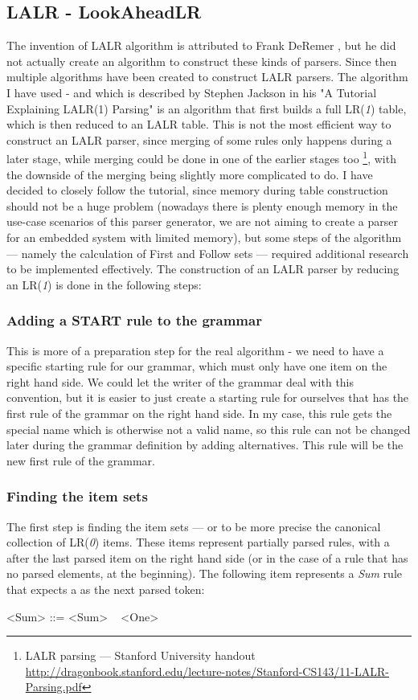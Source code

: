 \subsection{LALR - LookAheadLR}
The invention of LALR algorithm is attributed to Frank DeRemer \cite{deremer1969practical}, but he did not actually create an algorithm to construct these kinds of parsers. Since then multiple algorithms have been created to construct LALR parsers. The algorithm I have used - and which is described by Stephen Jackson in his "A Tutorial Explaining LALR(1) Parsing" \cite{lalr1} is an algorithm that first builds a full LR(\textit{1}) table, which is then reduced to an LALR table. This is not the most efficient way to construct an LALR parser, since merging of some rules only happens during a later stage, while merging could be done in one of the earlier stages too \footnote{LALR parsing --- Stanford University handout \url{http://dragonbook.stanford.edu/lecture-notes/Stanford-CS143/11-LALR-Parsing.pdf}}, with the downside of the merging being slightly more complicated to do. I have decided to closely follow the tutorial, since memory during table construction should not be a huge problem (nowadays there is plenty enough memory in the use-case scenarios of this parser generator, we are not aiming to create a parser for an embedded system with limited memory), but some steps of the algorithm ---  namely the calculation of First and Follow sets --- required additional research to be implemented effectively.
The construction of an LALR parser by reducing an LR(\textit{1}) is done in the following steps:
\subsubsection{Adding a START rule to the grammar}
This is more of a preparation step for the real algorithm - we need to have a specific starting rule for our grammar, which must only have one item on the right hand side. We could let the writer of the grammar deal with this convention, but it is easier to just create a starting rule for ourselves that has the first rule of the grammar on the right hand side. In my case, this rule gets the special name  which is otherwise not a valid name, so this rule can not be changed later during the grammar definition by adding alternatives. This rule will be the new first rule of the grammar. 
\subsubsection{Finding the item sets} 
The first step is finding the item sets --- or to be more precise the canonical collection of LR(\textit{0}) items. These items represent partially parsed rules, with a \textbullet ~ after the last parsed item on the right hand side (or in the case of a rule that has no parsed elements, at the beginning). The following item represents a \textit{Sum} rule that expects a \lit{+} as the next parsed token:
\begin{grammar}
<Sum> ::= <Sum> \textbullet ~ \lit{+} <One>
\end{grammar}

